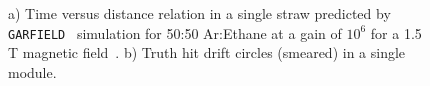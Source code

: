 \documentclass[a4paper,11pt]{article}
\begin{document}
\begin{figure}[!ht]
\centering
{}
    \vspace{-0.1cm}
    \caption{a) Time versus distance relation in a single straw predicted by \texttt{GARFIELD}~\cite{GARFIELD} simulation for 50:50 Ar:Ethane at a gain of $10^6$ for a 1.5 T magnetic field~\cite{g-2_TDR}. b) Truth hit drift circles (smeared) in a single module.}
\label{fig:drift} 
\end{figure}
\vspace{-0.4cm}
\end{document}
